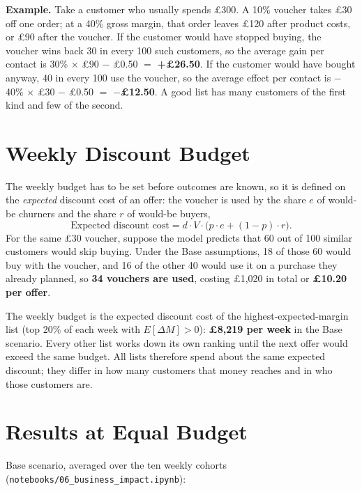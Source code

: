 \textbf{Example.} Take a customer who usually spends \pounds300. A 10\% voucher takes \pounds30 off one order; at a 40\% gross margin, that order leaves \pounds120 after product costs, or \pounds90 after the voucher. If the customer would have stopped buying, the voucher wins back 30 in every 100 such customers, so the average gain per contact is 30\% $\times$ \pounds90 $-$ \pounds0.50 $=$ \textbf{+\pounds26.50}. If the customer would have bought anyway, 40 in every 100 use the voucher, so the average effect per contact is $-$40\% $\times$ \pounds30 $-$ \pounds0.50 $=$ \textbf{$-$\pounds12.50}. A good list has many customers of the first kind and few of the second.

\section{Weekly Discount Budget}
\label{sec:7-3}

The weekly budget has to be set before outcomes are known, so it is defined on the \emph{expected} discount cost of an offer: the voucher is used by the share $e$ of would-be churners and the share $r$ of would-be buyers,
\begin{equation*}
    \text{Expected discount cost} = d \cdot V \cdot \big(p \cdot e + (1 - p) \cdot r\big).
\end{equation*}
For the same \pounds30 voucher, suppose the model predicts that 60 out of 100 similar customers would skip buying. Under the Base assumptions, 18 of those 60 would buy with the voucher, and 16 of the other 40 would use it on a purchase they already planned, so \textbf{34 vouchers are used}, costing \pounds1,020 in total or \textbf{\pounds10.20 per offer}.

The weekly budget is the expected discount cost of the highest-expected-margin list (top 20\% of each week with $E[\Delta M] > 0$): \textbf{\pounds8,219 per week} in the Base scenario. Every other list works down its own ranking until the next offer would exceed the same budget. All lists therefore spend about the same expected discount; they differ in how many customers that money reaches and in who those customers are.

\section{Results at Equal Budget}
\label{sec:7-4}

Base scenario, averaged over the ten weekly cohorts (\texttt{notebooks/06\_business\_impact.ipynb}):

